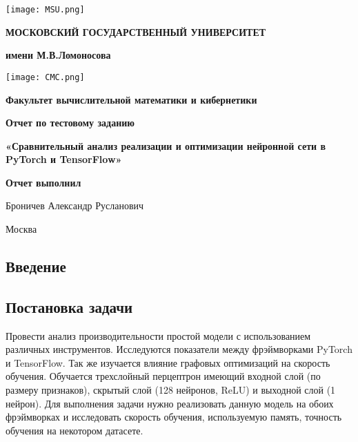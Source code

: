 \documentclass[a4paper,12pt,titlepage,final]{article}
\begin{document}
\begin{titlepage}
\centering\noindent
{
\begin{minipage}{0.1\textwidth}
\texttt{[image: MSU.png]}
\end{minipage}
\hfill
\begin{minipage}{0.77\textwidth}
\begin{center}
\textbf{МОСКОВСКИЙ ГОСУДАРСТВЕННЫЙ УНИВЕРСИТЕТ}\par
\textbf{имени М.В.Ломоносова}\par
\end{center}
\end{minipage}
\hfill
\begin{minipage}{0.1\textwidth}
\texttt{[image: CMC.png]}
\end{minipage}
}\par
{
\textbf{Факультет вычислительной математики и кибернетики}\par
\nointerlineskip
\noindent\makebox[\linewidth]{\rule{\textwidth}{0.4pt}}
}
\vfill
{
\Large{\textbf{Отчет по тестовому заданию}}\par
\Large{\textbf{«Сравнительный анализ реализации и оптимизации нейронной сети в PyTorch и
TensorFlow»}}\par
}
{
\Large{\textbf{Отчет выполнил}}\par
\Large{Броничев Александр Русланович}\par
}
\vfill
{\small Москва\\ \the\year{}}
\end{titlepage}

\tableofcontents
\newpage
\begin{center}
\section{Введение}
\subsection{Постановка задачи}
\end{center}

Провести анализ производительности простой модели с использованием различных инструментов. Исследуются показатели между фрэймворками PyTorch и TensorFlow. Так же изучается влияние графовых оптимизаций на скорость обучения. Обучается трехслойный перцептрон имеющий входной слой (по размеру признаков), скрытый слой (128 нейронов, ReLU) и выходной слой (1 нейрон). Для выполнения задачи нужно реализовать данную модель на обоих фрэймворках и исследовать скорость обучения, используемую память, точность обучения на некотором датасете.
\end{document}
